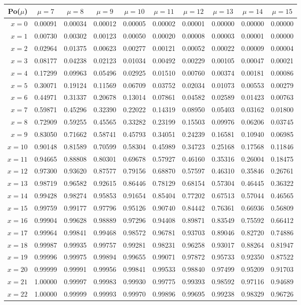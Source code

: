 \vspace{8pt minus 6pt}
\begin{tabular}{r|ccccccccc}
Po($\mu$)& $\mu=7$ & $\mu=8$ & $\mu=9$ & $\mu=10$ & $\mu=11$ & $\mu=12$ & $\mu=13$ & $\mu=14$ & $\mu=15$ \\\hline
$x= 0$&0.00091&0.00034&0.00012&0.00005&0.00002&0.00001&0.00000&0.00000&0.00000\\
$x= 1$&0.00730&0.00302&0.00123&0.00050&0.00020&0.00008&0.00003&0.00001&0.00000\\
$x= 2$&0.02964&0.01375&0.00623&0.00277&0.00121&0.00052&0.00022&0.00009&0.00004\\
$x= 3$&0.08177&0.04238&0.02123&0.01034&0.00492&0.00229&0.00105&0.00047&0.00021\\
$x= 4$&0.17299&0.09963&0.05496&0.02925&0.01510&0.00760&0.00374&0.00181&0.00086\\
$x= 5$&0.30071&0.19124&0.11569&0.06709&0.03752&0.02034&0.01073&0.00553&0.00279\\
$x= 6$&0.44971&0.31337&0.20678&0.13014&0.07861&0.04582&0.02589&0.01423&0.00763\\
$x= 7$&0.59871&0.45296&0.32390&0.22022&0.14319&0.08950&0.05403&0.03162&0.01800\\
$x= 8$&0.72909&0.59255&0.45565&0.33282&0.23199&0.15503&0.09976&0.06206&0.03745\\
$x= 9$&0.83050&0.71662&0.58741&0.45793&0.34051&0.24239&0.16581&0.10940&0.06985\\
$x=10$&0.90148&0.81589&0.70599&0.58304&0.45989&0.34723&0.25168&0.17568&0.11846\\
$x=11$&0.94665&0.88808&0.80301&0.69678&0.57927&0.46160&0.35316&0.26004&0.18475\\
$x=12$&0.97300&0.93620&0.87577&0.79156&0.68870&0.57597&0.46310&0.35846&0.26761\\
$x=13$&0.98719&0.96582&0.92615&0.86446&0.78129&0.68154&0.57304&0.46445&0.36322\\
$x=14$&0.99428&0.98274&0.95853&0.91654&0.85404&0.77202&0.67513&0.57044&0.46565\\
$x=15$&0.99759&0.99177&0.97796&0.95126&0.90740&0.84442&0.76361&0.66936&0.56809\\
$x=16$&0.99904&0.99628&0.98889&0.97296&0.94408&0.89871&0.83549&0.75592&0.66412\\
$x=17$&0.99964&0.99841&0.99468&0.98572&0.96781&0.93703&0.89046&0.82720&0.74886\\
$x=18$&0.99987&0.99935&0.99757&0.99281&0.98231&0.96258&0.93017&0.88264&0.81947\\
$x=19$&0.99996&0.99975&0.99894&0.99655&0.99071&0.97872&0.95733&0.92350&0.87522\\
$x=20$&0.99999&0.99991&0.99956&0.99841&0.99533&0.98840&0.97499&0.95209&0.91703\\
$x=21$&1.00000&0.99997&0.99983&0.99930&0.99775&0.99393&0.98592&0.97116&0.94689\\
$x=22$&1.00000&0.99999&0.99993&0.99970&0.99896&0.99695&0.99238&0.98329&0.96726\\

\end{tabular}

\vspace{8pt minus 6pt}
